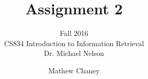 \documentclass[10pt,letterpaper,bibliography=totocnumbered]{scrartcl}
\begin{document}
\author{Mathew Chaney}
\title{Assignment 2}
\subtitle{Fall 2016\\ CS834 Introduction to Information Retrieval\\ Dr. Michael Nelson}
\maketitle
\newpage

\tableofcontents
\listoffigures
\lstlistoflistings
\listoftables






\end{document}
